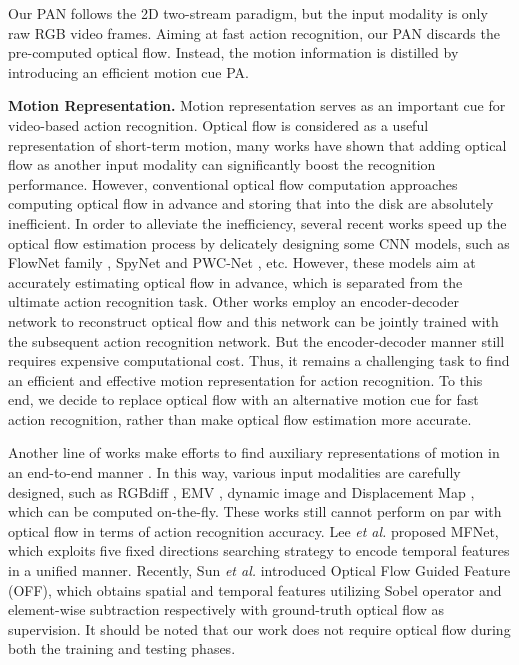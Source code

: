 \documentclass[journal]{IEEEtran}
\begin{document}
Our PAN follows the 2D two-stream paradigm, but the input modality is only raw RGB video frames. Aiming at fast action recognition, our PAN discards the pre-computed optical flow. Instead, the motion information is distilled by introducing an efficient motion cue PA.


\textbf{Motion Representation.} Motion representation serves as an important cue for video-based action recognition. Optical flow is considered as a useful representation of short-term motion, many works \cite{simonyan2014two,wang2016temporal,ji20133d,tran2015learning,carreira2017quo} have shown that adding optical flow as another input modality can significantly boost the recognition performance. However, conventional optical flow computation approaches \cite{horn1981determining,zach2007duality,sun2010secrets} computing optical flow in advance and storing that into the disk are absolutely inefficient. In order to alleviate the inefficiency, several recent works speed up the optical flow estimation process by delicately designing some CNN models, such as FlowNet family \cite{dosovitskiy2015flownet,ilg2017flownet}, SpyNet \cite{ranjan2017optical} and PWC-Net \cite{sun2018pwc}, etc. However, these models aim at accurately estimating optical flow in advance, which is separated from the ultimate action recognition task. Other works \cite{ng2018actionflownet,zhu2017hidden} employ an encoder-decoder network to reconstruct optical flow and this network can be jointly trained with the subsequent action recognition network. But the encoder-decoder manner still requires expensive computational cost. Thus, it remains a challenging task to find an efficient and effective motion representation for action recognition. To this end, we decide to replace optical flow with an alternative motion cue for fast action recognition, rather than make optical flow estimation more accurate.



Another line of works make efforts to find auxiliary representations of motion in an end-to-end manner \cite{fan2018end, huang2018toward}. In this way, various input modalities are carefully designed, such as RGBdiff \cite{wang2016temporal}, EMV \cite{Zhang2018RealTimeAR}, dynamic image \cite{Bilen2018ActionRW} and Displacement Map \cite{zhao2018recognize}, which can be computed on-the-fly. These works still cannot perform on par with optical flow in terms of action recognition accuracy. Lee \emph{et al.} \cite{lee2018motion} proposed MFNet, which exploits five fixed directions searching strategy to encode temporal features in a unified manner.  Recently, Sun \emph{et al.} \cite{sun2018optical} introduced Optical Flow Guided Feature (OFF), which obtains spatial and temporal features utilizing Sobel operator and element-wise subtraction respectively with ground-truth optical flow as supervision. It should be noted that our work does not require optical flow during both the training and testing phases.
\end{document}
